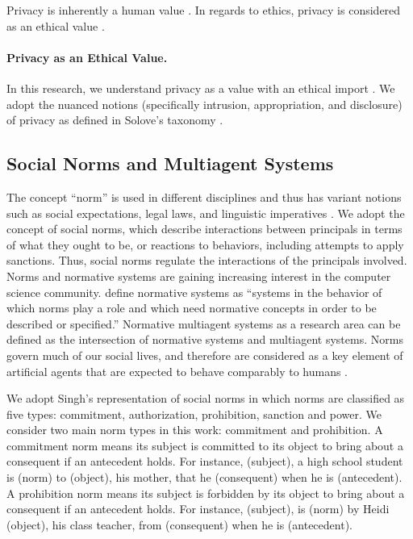 Privacy is inherently a human value \citep{spiekermann2009enggprivacy,smith2007privacy}. 
In regards to ethics, privacy is considered as an ethical value \citep{Langheinrich-01:privacy,Taylor-2002-PrivacyAutonomy}. 


\paragraph*{Privacy as an Ethical Value.}
In this research, we understand privacy as a value with an ethical import \citep{Langheinrich-01:privacy,Taylor-2002-PrivacyAutonomy}. 
We adopt the nuanced notions (specifically intrusion, appropriation, and disclosure) of privacy as defined in Solove's taxonomy \citep{solove-2006-taxonomy}. 


\subsection{Social Norms and Multiagent Systems}

The concept ``norm'' is used in different disciplines and thus has
variant notions such as social expectations, legal laws, and linguistic
imperatives \citep{Boella2009NormativeSystems}. We adopt the concept of
social norms, which describe interactions between principals in terms of
what they ought to be, or reactions to behaviors, including attempts to
apply sanctions. Thus, social norms regulate the interactions of the
principals involved. Norms and normative systems are gaining increasing
interest in the computer science community. \citet{Meyer+Wieringa-93}
define normative systems as ``systems in the behavior of which norms
play a role and which need normative concepts in order to be described
or specified.'' Normative multiagent systems as a research area can be
defined as the intersection of normative systems and multiagent systems.
Norms govern much of our social lives, and therefore are considered as a
key element of artificial agents that are expected to behave comparably
to humans \citep{boella2006normative}. 

We adopt Singh's
 representation of social norms in which norms
are classified as five types: commitment, authorization, prohibition,
sanction and power.
We consider two main norm types in this work: commitment and prohibition. 
A commitment norm means its subject is committed to its object to bring about a consequent if an antecedent holds. 
For instance,  (subject), a high school student is  (norm) to  (object), his mother, that he  (consequent) when he is  (antecedent).
A prohibition norm means its subject is forbidden by its object to bring about a consequent if an antecedent holds. 
For instance,  (subject), is  (norm) by Heidi (object), his class teacher, from  (consequent) when he is  (antecedent).


